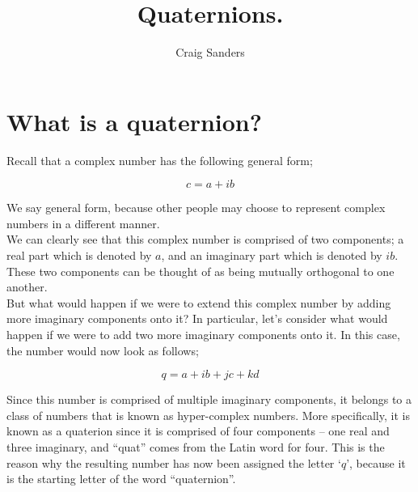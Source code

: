 \documentclass[12pt, a4paper]{article}
\title{Quaternions.}
\author{Craig Sanders}
\begin{document}
\maketitle


\newpage

\section{What is a quaternion?}

Recall that a complex number has the following general form;

\begin{equation}\label{eqn:Complex_number_definition}
c = a + ib
\end{equation}

We say general form, because other people may choose to represent complex
numbers in a different manner.\\

We can clearly see that this complex number is comprised of two components; a
real part which is denoted by \(a\), and an imaginary part which is denoted by
\(ib\). These two components can be thought of as being mutually orthogonal to
one another.\\

But what would happen if we were to extend this complex number by adding more
imaginary components onto it? In particular, let's consider what would happen
if we were to add two more imaginary components onto it. In this case, the
number would now look as follows;

\begin{equation}\label{eqn:Quaternion_definition}
q = a + ib + jc + kd
\end{equation}

Since this number is comprised of multiple imaginary components, it belongs to
a class of numbers that is known as hyper-complex numbers. More specifically, it
is known as a quaterion since it is comprised of four components -- one real
and three imaginary, and ``quat'' comes from the Latin word for four. This is
the reason why the resulting number has now been assigned the letter `\(q\)',
because it is the starting letter of the word ``quaternion''.


\end{document}
